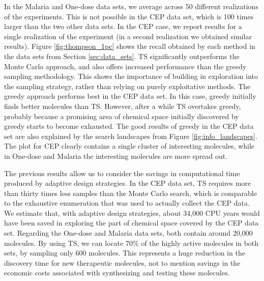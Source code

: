 In the Malaria and One-dose data sets, we average across 50 different realizations of the experiments. This is not possible in the CEP data set, which is 100 times larger than the two other data sets. In the CEP case, we report results for a single realization of the experiment (in a second realization we obtained similar results). 
Figure \ref{fig:thompson_1pc} shows the recall obtained by each method in the data sets from 
Section \ref{sec:data_sets}. TS significantly outperforms the Monte Carlo approach, and also offers increased performance than the greedy sampling methodology. This shows the importance of building in exploration into the sampling strategy, rather than relying on purely exploitative methods. The greedy approach performs best in the CEP data set. In this case, greedy initially finds better molecules than TS. However, after a while TS overtakes greedy, probably because a promising area of chemical space 
initially discovered by greedy starts to become exhausted. The good results of greedy in the CEP data set are also explained by the search landscapes from Figure \ref{fig:info_landscapes}. The plot for CEP clearly contains a single cluster of interesting molecules, while in One-dose and Malaria the interesting molecules are more spread out.

The previous results allow us to consider the savings in computational time produced by adaptive design strategies. In the CEP data set, TS requires more than thirty times less samples than the Monte Carlo search, which is comparable to the exhaustive enumeration that was used to actually collect the CEP data. We estimate that, with adaptive design strategies, about 34,000 CPU years would have been saved in exploring the part of chemical space covered by the CEP data set. Regarding the One-dose and Malaria data sets, both contain around 20,000 molecules. By using TS, we can locate 70\% of the highly active molecules in both sets, by sampling only 600 molecules. This represents a huge reduction in the discovery time for new therapeutic molecules, not to mention savings in the economic costs associated with synthesizing and testing these molecules.

